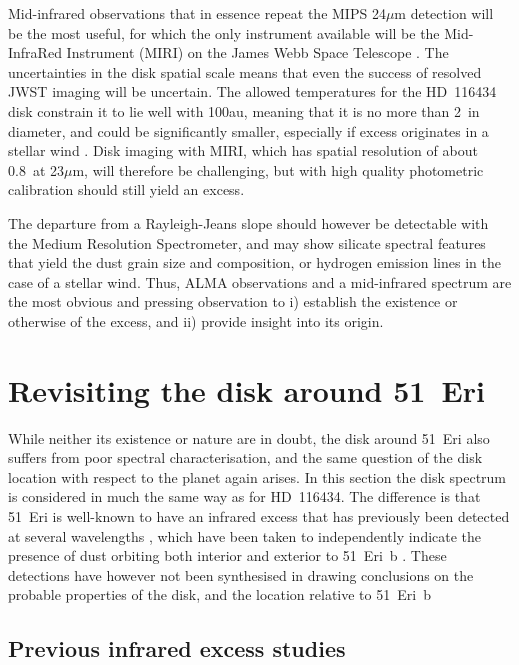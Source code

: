 \documentclass[a4paper,fleqn,usenatbib]{mnras}
\begin{document}
Mid-infrared observations that in essence repeat the MIPS 24$\mu$m
detection will be the most useful, for which the only instrument
available will be the Mid-InfraRed Instrument (MIRI) on the James Webb
Space Telescope
\citep[JWST,][]{2015PASP..127..584R,2015PASP..127..612B,2015PASP..127..646W}. The
uncertainties in the disk spatial scale means that even the success of
resolved JWST imaging will be uncertain. The allowed temperatures for
the HD~116434 disk constrain it to lie well with 100au, meaning that it
is no more than 2\arcsec~in diameter, and could be significantly
smaller, especially if excess originates in a stellar wind . Disk
imaging with MIRI, which has spatial resolution of about 0.8\arcsec~at
23$\mu$m, will therefore be challenging, but with high quality
photometric calibration should still yield an excess.

The departure from a Rayleigh-Jeans slope should however be detectable
with the Medium Resolution Spectrometer, and may show silicate spectral
features that yield the dust grain size and composition, or hydrogen
emission lines in the case of a stellar wind. Thus, ALMA observations
and a mid-infrared spectrum are the most obvious and pressing
observation to i) establish the existence or otherwise of the excess,
and ii) provide insight into its origin.

\section{Revisiting the disk around 51~Eri}\label{s:51eri}

While neither its existence or nature are in doubt, the disk around
51~Eri also suffers from poor spectral characterisation, and the same
question of the disk location with respect to the planet again
arises. In this section the disk spectrum is considered in much the same
way as for HD~116434. The difference is that 51~Eri is well-known to
have an infrared excess that has previously been detected at several
wavelengths \citep{2014ApJS..212...10P,2014A&A...565A..68R}, which have
been taken to independently indicate the presence of dust orbiting both
interior and exterior to 51~Eri~b \citep{2015Sci...350...64M}. These
detections have however not been synthesised in drawing conclusions on
the probable properties of the disk, and the location relative to
51~Eri~b

\subsection{Previous infrared excess studies}\label{s:51eri:ss:prev}
\end{document}
